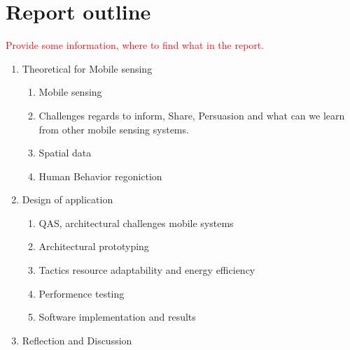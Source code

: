 \section{Report outline} \textcolor{red}{Provide some information, where to find what in the report.}


\begin{enumerate}
    \item Theoretical for Mobile sensing
    \begin{enumerate}
        \item Mobile sensing
        \item Challenges regards to inform, Share, Persuasion and what can we learn from other mobile sensing systems.
        \item Spatial data
        \item Human Behavior regoniction
    \end{enumerate}
    \item Design of application
    \begin{enumerate}
        \item QAS, architectural challenges mobile systems
        \item Architectural prototyping
        \item Tactics resource adaptability and energy efficiency
        \item Performence testing
        \item Software implementation and results
    \end{enumerate}
    \item Reflection and Discussion
\end{enumerate}